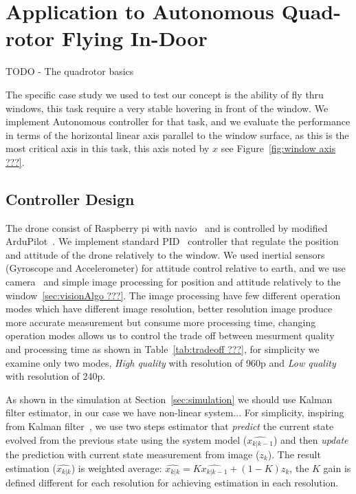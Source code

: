 \documentclass{sig-alternate-ipsn13}
\begin{document}
\section{Application to Autonomous Quad-rotor Flying In-Door}
\label{sec:caseStady}


TODO - The quadrotor basics

The specific case study we used to test our concept is the ability of fly thru windows, this task require a very stable hovering in front of the window.
We implement Autonomous controller for that task, and we evaluate the performance in terms of the horizontal linear axis parallel to the window surface, as this is the most critical axis in this task, this axis noted by $x$ see Figure~\ref{fig:window axis ???}.

\subsection{Controller Design}
The drone consist of Raspberry pi with navio~\cite{??? raspberry, navio} and is controlled by modified ArduPilot~\cite{??? APM}.
We implement standard PID~\cite{??? PID} controller that regulate the position and attitude of the drone relatively to the window.
We used inertial sensors (Gyroscope and Accelerometer) for attitude control relative to earth, and we use camera~\cite{??? picam} and simple image processing for position and attitude relatively to the window~\ref{sec:visionAlgo ???}.
The image processing have few different operation modes which have different image resolution, better resolution image produce more accurate measurement but consume more processing time, changing operation modes allows us to control the trade off between mesurment quality and processing time as shown in Table~\ref{tab:tradeoff ???}, for simplicity we examine only two modes, \textit{High quality} with resolution of 960p and \textit{Low quality} with resolution of 240p.

As shown in the simulation at Section~\ref{sec:simulation} we should use Kalman filter estimator, in our case we have non-linear system... %
For simplicity, inspiring from Kalman filter~\cite{??? kalman}, we use two steps estimator that \textit{predict} the current state evolved from the previous state using the system model ($\hat{x_{k|k-1}}$) and then \textit{update} the prediction with current state measurement from image ($z_k$).
The result estimation ($\hat{x_{k|k}}$) is weighted average: 
$ \hat{x_{k|k}} = K \hat{x_{k|k-1}} + (1-K) z_k $, 
the $K$ gain is defined different for each resolution for achieving estimation in each resolution.
\end{document}
